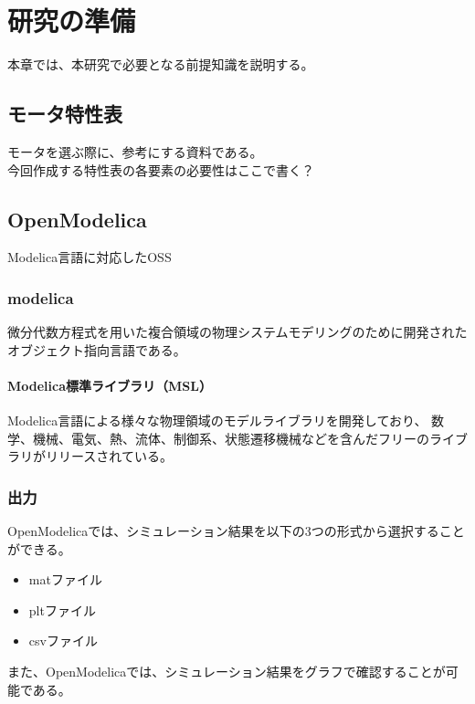 \chapter{研究の準備}\label{cha:Preparation}
本章では、本研究で必要となる前提知識を説明する。



\section{モータ特性表}\label{toku}
モータを選ぶ際に、参考にする資料である。\\
今回作成する特性表の各要素の必要性はここで書く？



\section{OpenModelica}\label{OM}
Modelica言語に対応したOSS
    \subsection{modelica}\label{modelica}
微分代数方程式を用いた複合領域の物理システムモデリングのために開発されたオブジェクト指向言語である。\\
        \subsubsection{Modelica標準ライブラリ（MSL）}\label{MSL}
        Modelica言語による様々な物理領域のモデルライブラリを開発しており、
        数学、機械、電気、熱、流体、制御系、状態遷移機械などを含んだフリーのライブラリがリリースされている。

    \subsection{出力}\label{output}
OpenModelicaでは、シミュレーション結果を以下の3つの形式から選択することができる。

\begin{itemize}
    \item matファイル
    \item pltファイル
    \item csvファイル
\end{itemize}

また、OpenModelicaでは、シミュレーション結果をグラフで確認することが可能である。